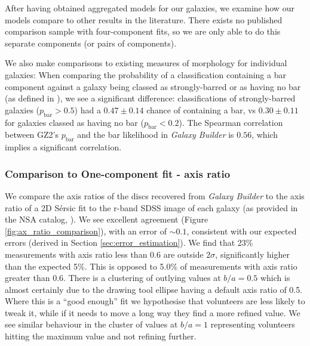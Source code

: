 \documentclass[../main.tex]{subfiles}
\begin{document}
After having obtained aggregated models for our galaxies, we examine how our models compare to other results in the literature. There exists no published comparison sample with four-component fits, so we are only able to do this separate components (or pairs of components).

We also make comparisons to existing measures of morphology for individual galaxies: When comparing the probability of a classification containing a bar component against a galaxy being classed as strongly-barred or as having no bar (as defined in \citealt{Masters2010:1003.0449v2}), we see a significant difference: classifications of strongly-barred galaxies ($p_\text{bar} > 0.5$) had a $0.47 \pm 0.14$ chance of containing a bar, vs $0.30 \pm 0.11$ for galaxies classed as having no bar ($p_\text{bar} < 0.2$). The Spearman correlation between GZ2's $p_\text{bar}$ and the bar likelihood in \textit{Galaxy Builder} is $0.56$, which implies a significant correlation.

\subsubsection{Comparison to One-component fit - axis ratio}
We compare the axis ratios of the discs recovered from \textit{Galaxy Builder} to the axis ratio of a 2D S\'ersic fit to the r-band SDSS image of each galaxy (as provided in the NSA catalog, \citealt{2011AJ....142...31B}).
We see excellent agreement (Figure \ref{fig:ax_ratio_comparison}), with an error of $\sim0.1$, consistent with our expected errors (derived in Section \ref{sec:error_estimation}). We find that 23\% measurements with axis ratio less than 0.6 are outside $2\sigma$, significantly higher than the expected 5\%. This is opposed to 5.0\% of measurements with axis ratio greater than 0.6. There is a clustering of outlying values at $b/a=0.5$ which is almost certainly due to the drawing tool ellipse having a default axis ratio of 0.5. Where this is a ``good enough'' fit we hypothesise that volunteers are less likely to tweak it, while if it needs to move a long way they find a more refined value. We see similar behaviour in the cluster of values at $b/a=1$ representing volunteers hitting the maximum value and not refining further.
\end{document}
